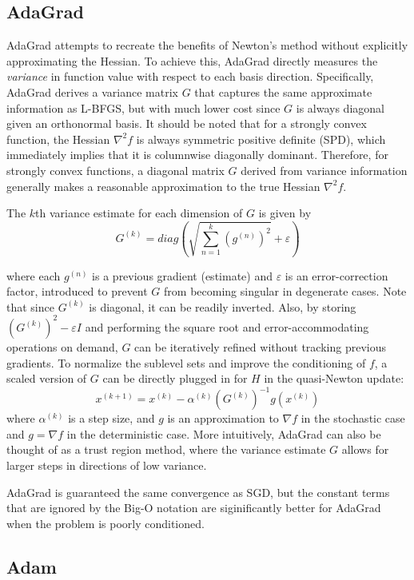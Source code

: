 \documentclass[letterpaper, 10 pt, conference]{IEEEtran}  %
\begin{document}
\subsection{AdaGrad}

AdaGrad \cite{duchi2013proximal} attempts to recreate the benefits of
Newton's method without explicitly approximating the Hessian.  To
achieve this, AdaGrad directly measures the \textit{variance} in
function value with respect to each basis direction.  Specifically,
AdaGrad derives a variance matrix $G$ that captures the same
approximate information as L-BFGS, but with much lower cost since $G$
is always diagonal given an orthonormal basis.  It should be noted
that for a strongly convex function, the Hessian $\nabla^2 f$ is
always symmetric positive definite (SPD), which immediately implies
that it is columnwise diagonally dominant.  Therefore, for strongly
convex functions, a diagonal matrix $G$ derived from variance
information generally makes a reasonable approximation to the true
Hessian $\nabla^2 f$.

The $k$th variance estimate for each dimension of $G$ is given by
$$ G^{(k)} = diag\left(\sqrt{\sum_{n=1}^k (g^{(n)})^2} + \varepsilon\right) $$

where each $g^{(n)}$ is a previous gradient (estimate) and
$\varepsilon$ is an error-correction factor, introduced to prevent $G$
from becoming singular in degenerate cases.  Note that since $G^{(k)}$
is diagonal, it can be readily inverted.  Also, by storing
$\left(G^{(k)}\right)^2 - \varepsilon I$ and performing the square
root and error-accommodating operations on demand, $G$ can be
iteratively refined without tracking previous gradients.  To normalize
the sublevel sets and improve the conditioning of $f$, a scaled
version of $G$ can be directly plugged in for $H$ in the quasi-Newton
update:
$$ x^{(k+1)} = x^{(k)} - \alpha^{(k)} (G^{(k)})^{-1} g(x^{(k)}) $$
where $\alpha^{(k)}$ is a step size, and $g$ is an approximation to
$\nabla f$ in the stochastic case and $g = \nabla f$ in the
deterministic case.  More intuitively, AdaGrad can also be thought of
as a trust region method, where the variance estimate $G$ allows for
larger steps in directions of low variance.

AdaGrad is guaranteed the same convergence as SGD, but the constant
terms that are ignored by the Big-O notation are siginificantly better
for AdaGrad when the problem is poorly conditioned.

\subsection{Adam}
\end{document}
